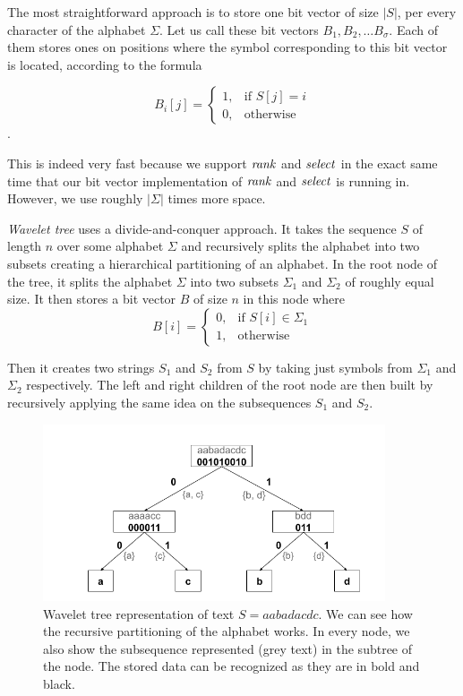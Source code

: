The most straightforward approach is to store one bit vector of size $|S|$,
per every character of the alphabet $\Sigma$. Let us call these bit vectors $B_1,
B_2, \ldots B_{\sigma}$. Each of them stores ones on positions where the symbol corresponding
to this bit vector is located, according to the formula

\[
    B_i[j]= 
\begin{cases}
	1,& \text{if } S[j]=i \\
    0,& \text{otherwise}
\end{cases}
\].

This is indeed very fast because we support $\mathit{rank}$ and $\mathit{select}$ in the exact same time
that our bit vector implementation of $\mathit{rank}$ and $\mathit{select}$ is running in. However, we use
roughly $|\Sigma|$ times more space.

\textit{Wavelet tree} uses a divide-and-conquer approach. It takes the sequence $S$ of
length $n$ over some alphabet $\Sigma$ and recursively splits the alphabet into
two subsets creating a hierarchical partitioning of an alphabet. In the root node
of the tree, it splits the alphabet $\Sigma$ into two subsets $\Sigma_1$ and $\Sigma_2$
of roughly equal size. It then stores a bit vector $B$ of size $n$ in this node
where
\[
    B[i]= 
\begin{cases}
    0,& \text{if } S[i]\in \Sigma_1\\
    1,              & \text{otherwise}
\end{cases}
\]

Then it creates two strings $S_1$ and $S_2$ from $S$ by taking just symbols
from $\Sigma_1$ and $\Sigma_2$ respectively. The left and right children of the root node
are then built by recursively applying the same idea on the subsequences $S_1$ and $S_2$.

\begin{figure}
	\centerline{
		\includegraphics[width=0.9\textwidth, height=0.3\textheight]{images/wavelet_tree}
	}
	\caption[TODO]{Wavelet tree representation of text $S=\mathit{aabadacdc}$. We can see how
	the recursive partitioning of the alphabet works. In every node, we also show the
	subsequence represented (grey text) in the subtree of the node. The stored data can be
	recognized as they are in bold and black.
	}
	\label{obr:WaveletTreeExample}
\end{figure}

